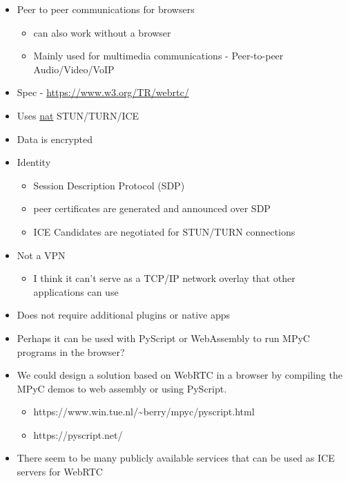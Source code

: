 \begin{itemize}
\tightlist
\item
  Peer to peer communications for browsers

  \begin{itemize}
  \tightlist
  \item
    can also work without a browser
  \item
    Mainly used for multimedia communications - Peer-to-peer
    Audio/Video/VoIP
  \end{itemize}
\item
  Spec -
  \href{https://www.w3.org/TR/webrtc/\#persistent-information-exposed-by-webrtc}{https://www.w3.org/TR/webrtc/}
\item
  Uses \protect\hyperlink{notes__02021-internet-protocol.md}{nat}
  STUN/TURN/ICE
\item
  Data is encrypted
\item
  Identity

  \begin{itemize}
  \tightlist
  \item
    Session Description Protocol (SDP)
  \item
    peer certificates are generated and announced over SDP
  \item
    ICE Candidates are negotiated for STUN/TURN connections
  \end{itemize}
\item
  Not a VPN

  \begin{itemize}
  \tightlist
  \item
    I think it can't serve as a TCP/IP network overlay that other
    applications can use
  \end{itemize}
\item
  Does not require additional plugins or native apps
\item
  Perhaps it can be used with PyScript or WebAssembly to run MPyC
  programs in the browser?
\item
  We could design a solution based on WebRTC in a browser by compiling
  the MPyC demos to web assembly or using PyScript.

  \begin{itemize}
  \tightlist
  \item
    https://www.win.tue.nl/\textasciitilde berry/mpyc/pyscript.html
  \item
    https://pyscript.net/
  \end{itemize}
\item
  There seem to be many publicly available services that can be used as
  ICE servers for WebRTC


\end{itemize}
